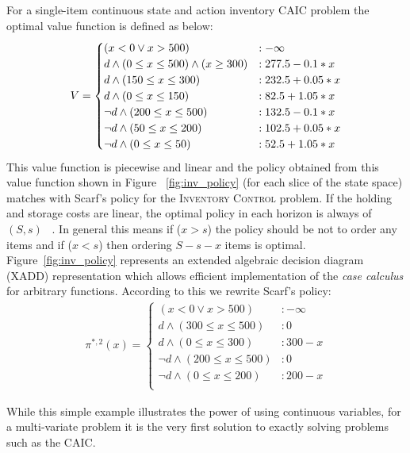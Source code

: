 \documentclass[twoside,11pt]{article}
\newcommand{\InventoryControl}{\textsc{Inventory Control }}
\begin{document}
For a single-item continuous state and action inventory CAIC problem the optimal value function is defined as below:
\vspace{-4mm}
\begin{align}
V = \begin{cases}
(x < 0 \vee x>500) &: -\infty \\
d \land (0 \leq x \leq 500) \land (x \geq 300) &:  277.5 - 0.1 * x \\
d \land (150 \leq x \leq 300) &:  232.5 + 0.05 * x \\
d \land ( 0 \leq x \leq 150) &:  82.5 + 1.05 * x \\
\neg d \land (200 \leq x \leq 500)  &:  132.5 - 0.1 * x \\
\neg d \land (50 \leq x \leq 200) &: 102.5 + 0.05 * x \\
\neg d \land (0 \leq x \leq 50) &:  52.5 + 1.05 * x \\
\end{cases} \label{eq:vfun_inv}
\vspace{-7mm}
\end{align}
This value function is piecewise and linear and the policy obtained from this value function shown in Figure ~\ref{fig:inv_policy} (for each slice of the state space) matches with Scarf's policy for the \InventoryControl problem. If the holding and storage costs are linear, the optimal policy in each horizon is always of $(S,s)$ ~\cite{Scarf_Karlin58}. In general this means if ($x>s$) the policy should be not to order any items and if ($x<s$) then ordering $S-s-x$ items is optimal. Figure~\ref{fig:inv_policy} represents an extended algebraic decision diagram (XADD) representation which allows efficient implementation of the \emph{case calculus} for arbitrary functions. 
According to this we rewrite Scarf's policy: 
\begin{align}
\pi^{*,2}(x) = 
\begin{cases}
(x < 0 \vee x>500) &: -\infty \\
d \land (300 \leq x \leq 500)  &:  0 \\
d \land (0 \leq x \leq 300) &:  300 - x \\
\neg d \land (200 \leq x \leq 500) &:  0 \\
\neg d \land (0 \leq x \leq 200) &:  200 - x \\
\end{cases}
\end{align}

While this simple example illustrates the power of using continuous variables, for a multi-variate problem it is the very first solution to exactly solving problems such as the CAIC. 
\end{document}
